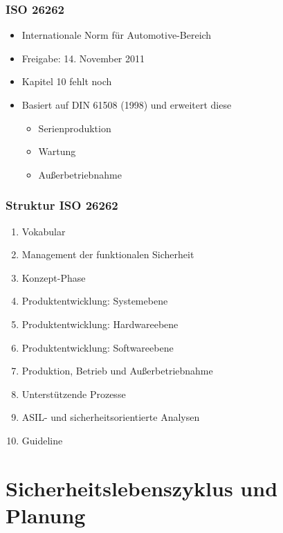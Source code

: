\documentclass[]{beamer}
\begin{document}
\begin{frame}
\frametitle{ISO 26262}

\begin{itemize}
    \item Internationale Norm für Automotive-Bereich
    \item Freigabe: 14. November 2011
    \item Kapitel 10 fehlt noch
    \item Basiert auf DIN 61508 (1998) und erweitert diese
    \begin{itemize}
        \item Serienproduktion
        \item Wartung
        \item Außerbetriebnahme
    \end{itemize}
\end{itemize}

\end{frame}




\begin{frame}
\frametitle{Struktur ISO 26262}

\begin{enumerate}
    \item Vokabular
    \item Management der funktionalen Sicherheit
    \item Konzept-Phase
    \item Produktentwicklung: Systemebene
    \item Produktentwicklung: Hardwareebene
    \item Produktentwicklung: Softwareebene
    \item Produktion, Betrieb und Außerbetriebnahme
    \item Unterstützende Prozesse
    \item ASIL- und sicherheitsorientierte Analysen
    \item Guideline
\end{enumerate}

\end{frame}



\section{Sicherheitslebenszyklus und Planung}
\label{sec:Sicherheitslebenszyklus_Planung}
\end{document}

